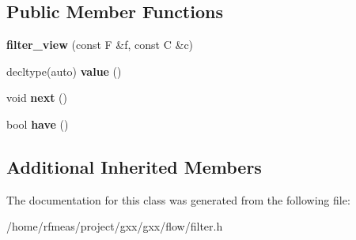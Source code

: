 \subsection*{Public Member Functions}
\begin{DoxyCompactItemize}
\item 
{\bfseries filter\+\_\+view} (const F \&f, const C \&c)\hypertarget{classgxx_1_1flow_1_1filter__view_a334c330acd4e3c487486020000d0dd1b}{}\label{classgxx_1_1flow_1_1filter__view_a334c330acd4e3c487486020000d0dd1b}

\item 
decltype(auto) {\bfseries value} ()\hypertarget{classgxx_1_1flow_1_1filter__view_a0a78b8715d979b2cd0f1bd54ed08b909}{}\label{classgxx_1_1flow_1_1filter__view_a0a78b8715d979b2cd0f1bd54ed08b909}

\item 
void {\bfseries next} ()\hypertarget{classgxx_1_1flow_1_1filter__view_a331c55980e0c7a6e575fcdb0fc91eac8}{}\label{classgxx_1_1flow_1_1filter__view_a331c55980e0c7a6e575fcdb0fc91eac8}

\item 
bool {\bfseries have} ()\hypertarget{classgxx_1_1flow_1_1filter__view_a7ce314457f20751f1848696ef66aa469}{}\label{classgxx_1_1flow_1_1filter__view_a7ce314457f20751f1848696ef66aa469}

\end{DoxyCompactItemize}
\subsection*{Additional Inherited Members}


The documentation for this class was generated from the following file\+:\begin{DoxyCompactItemize}
\item 
/home/rfmeas/project/gxx/gxx/flow/filter.\+h\end{DoxyCompactItemize}
